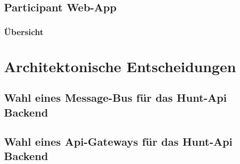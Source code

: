 \subsection{Participant Web-App}

\subsubsection{Übersicht}

\section{Architektonische Entscheidungen}

\subsection{Wahl eines Message-Bus für das Hunt-Api Backend}


\subsection{Wahl eines Api-Gateways für das Hunt-Api Backend}




